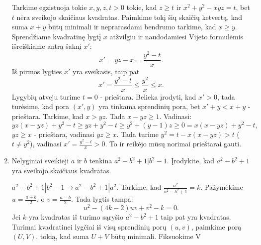 \begin{enumerate}
\begin{sprendimas}
Tarkime egzistuoja tokie $x,y,z,t>0$ tokie, kad $z\geq t$ ir $x^2+y^2-xyz=t$, bet $t$ nėra sveikojo skaičiaus kvadratas. Paimkime tokį šių skaičių ketvertą, kad suma $x+y$ būtų minimali ir neprarasdami bendrumo tarkime, kad $x\geq y$. Sprendžiame kvadratinę lygtį $x$ atžvilgiu ir naudodamiesi Vijeto formulėmis išreiškiame antrą šaknį $x'$: $$x'=yz-x=\frac{y^2-t}{x}.$$ Iš pirmos lygties $x'$ yra sveikasis, taip pat $$x'=\frac{y^2-t}{x}\leq \frac{y^2}{x}\leq x.$$ Lygybių atveju turime $t=0$ - prieštara. Belieka įrodyti, kad $x'>0$, tada turėsime, kad pora $(x',y)$ yra tinkama sprendinių pora, bet $x'+y<x+y$ - prieštara.
Tarkime, kad $x>yz$. Tada $x-yz\geq 1$. Vadinasi: $$yz(x-yz)+y^2-t\geq yz+y^2-t\geq y^2+(y-1)z\geq 0=x(x-yz)+y^2-t,$$ $yz\geq x$ - prieštara, vadinasi $yz\geq x$. Tada turime $y^2=t-x(x-yz)>t$ ($t\not =y^2$), vadinasi $x'=\frac{y^2-t}{x}>0$. To ir reikėjo mūsų norimai prieštarai gauti.
\end{sprendimas}
\item Nelyginiai sveikieji $a$ ir $b$ tenkina $a^2-b^2+1|b^2-1$. Įrodykite, kad $a^2-b^2+1$ yra sveikojo skaičiaus kvadratas.

\begin{sprendimas}
$a^2-b^2+1|b^2-1\rightarrow a^2-b^2+1|a^2$. Tarkime, kad $\frac{a^2}{a^2-b^2+1}=k$. Pažymėkime $u=\frac{a+b}{2}$, o $v=\frac{a-b}{2}$. Tada lygtis tampa: $$u^2-(4k-2)uv+v^2-k=0.$$
Jei $k$ yra kvadratas iš turimo sąryšio $a^2-b^2+1$ taip pat yra kvadratas. Turimai kvadratinei lygčiai iš visų sprendinių porų $(u,v)$, paimkime porą $(U,V)$, tokią, kad suma $U+V$ būtų minimali. Fiksuokime V 
\end{sprendimas}

\end{enumerate}
